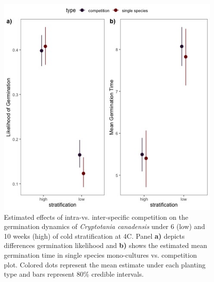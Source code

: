 \documentclass{article}\usepackage[]{graphicx}\usepackage[]{color}
\begin{document}
\begin{figure}[h!]
    \centering
\includegraphics[width=\textwidth]{..//figure/nichemodfication.jpeg}
   \caption{Estimated effects of intra-vs. inter-specific competition on the germination dynamics of \textit{Cryptotania canadensis} under 6 (low) and 10 weeks (high) of cold stratification at 4\degree C. Panel \textbf{a)} depicts differences germination likelihood and \textbf{b)} shows the estimated mean germination time in single species mono-cultures vs. competition plot. Colored dots represent the mean estimate under each planting type and bars represent 80\% credible intervals. } 
   \label{fig:nichemod}
\end{figure}
\end{document}
